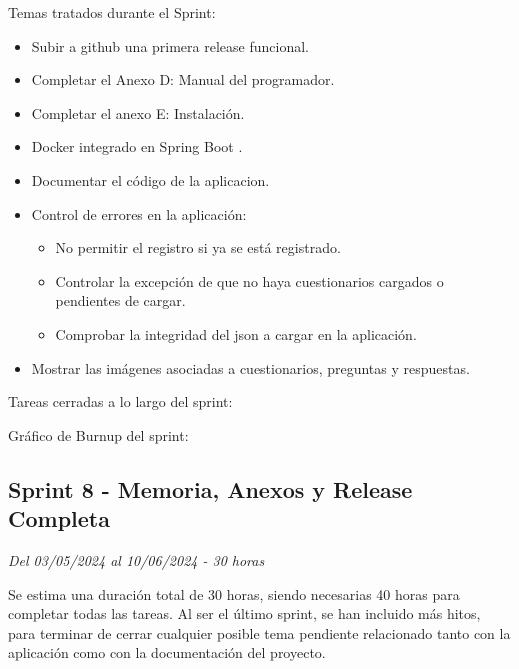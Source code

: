 Temas tratados durante el Sprint:
\begin{itemize}
	\item Subir a github una primera release funcional.
	\item Completar el Anexo D: Manual del programador.
	\item Completar el anexo E: Instalación.
	\item Docker integrado en Spring Boot \cite{web:SpringDocker}.
	\item Documentar el código de la aplicacion.
	\item Control de errores en la aplicación:
	\begin{itemize}
		\item No permitir el registro si ya se está registrado.
		\item Controlar la excepción de que no haya cuestionarios cargados o pendientes de cargar.
		\item Comprobar la integridad del json a cargar en la aplicación.
	\end{itemize}
	\item Mostrar las imágenes asociadas a cuestionarios, preguntas y respuestas.
\end{itemize}
\clearpage
Tareas cerradas a lo largo del sprint:

Gráfico de Burnup del sprint:

\clearpage
\subsection{Sprint 8 - Memoria, Anexos y Release Completa}
\textit{Del 03/05/2024 al 10/06/2024 - 30 horas} 

Se estima una duración total de 30 horas, siendo necesarias 40 horas para completar todas las tareas.
Al ser el último sprint, se han incluido más hitos, para terminar de cerrar cualquier posible tema pendiente relacionado tanto con la aplicación como con la documentación del proyecto.


